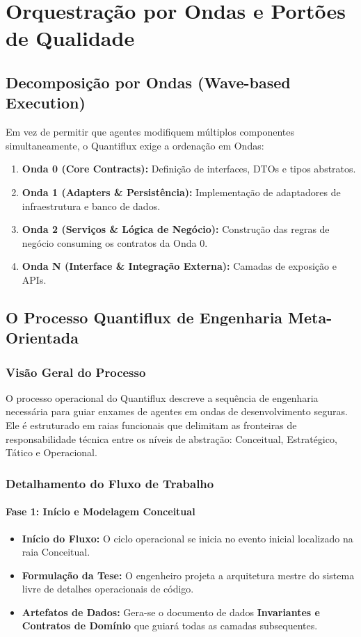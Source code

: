 \chapter{Orquestração por Ondas e Portões de Qualidade}

\section{Decomposição por Ondas (Wave-based Execution)}
Em vez de permitir que agentes modifiquem múltiplos componentes simultaneamente, o Quantiflux exige a ordenação em Ondas:

\begin{enumerate}
    \item \textbf{Onda 0 (Core Contracts):} Definição de interfaces, DTOs e tipos abstratos.
    \item \textbf{Onda 1 (Adapters \& Persistência):} Implementação de adaptadores de infraestrutura e banco de dados.
    \item \textbf{Onda 2 (Serviços \& Lógica de Negócio):} Construção das regras de negócio consuming os contratos da Onda 0.
    \item \textbf{Onda N (Interface \& Integração Externa):} Camadas de exposição e APIs.
\end{enumerate}

\section{O Processo Quantiflux de Engenharia Meta-Orientada}

\subsection{Visão Geral do Processo}
O processo operacional do Quantiflux descreve a sequência de engenharia necessária para guiar enxames de agentes em ondas de desenvolvimento seguras. Ele é estruturado em raias funcionais que delimitam as fronteiras de responsabilidade técnica entre os níveis de abstração: Conceitual, Estratégico, Tático e Operacional.

\subsection{Detalhamento do Fluxo de Trabalho}

\subsubsection{Fase 1: Início e Modelagem Conceitual}
\begin{itemize}
    \item \textbf{Início do Fluxo:} O ciclo operacional se inicia no evento inicial localizado na raia Conceitual.
    \item \textbf{Formulação da Tese:} O engenheiro projeta a arquitetura mestre do sistema livre de detalhes operacionais de código.
    \item \textbf{Artefatos de Dados:} Gera-se o documento de dados \textbf{Invariantes e Contratos de Domínio} que guiará todas as camadas subsequentes.
\end{itemize}

